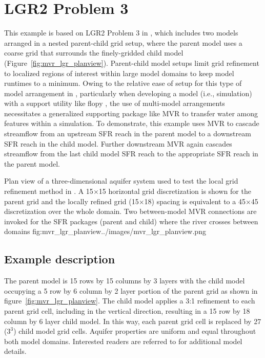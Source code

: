 \section{LGR2 Problem 3}

This example is based on LGR2 Problem 3 in \cite{mehl2013}, which includes two models arranged in a nested parent-child grid setup, where the parent model uses a coarse grid that surrounds the finely-gridded child model (Figure~\ref{fig:mvr_lgr_planview}).  Parent-child model setups limit grid refinement to localized regions of interest within large model domains to keep model runtimes to a minimum.  Owing to the relative ease of setup for this type of model arrangement in \mf, particularly when developing a model (i.e., simulation) with a support utility like flopy \citep{bakker2016}, the use of multi-model arrangements necessitates a generalized supporting package like MVR to transfer water among features within a simulation.  To demonstrate, this example uses MVR to cascade streamflow from an upstream SFR reach in the parent model to a downstream SFR reach in the child model.  Further downstream MVR again cascades streamflow from the last child model SFR reach to the appropriate SFR reach in the parent model.  

\begin{StandardFigure}
	{Plan view of a three-dimensional aquifer system used to test the local grid refinement method in \mf. A 15$\times$15 horizontal grid discretization is shown for the parent grid and the locally refined grid (15$\times$18) spacing is equivalent to a 45$\times$45 discretization over the whole domain.  Two between-model MVR connections are invoked for the SFR packages (parent and child) where the river crosses between domains}
	{fig:mvr_lgr_planview}{../images/mvr_lgr_planview.png}
\end{StandardFigure}

\subsection{Example description}

The parent model is 15 rows by 15 columns by 3 layers with the child model occupying a 5 row by 6 column by 2 layer portion of the parent grid as shown in figure~\ref{fig:mvr_lgr_planview}.  The child model applies a 3:1 refinement to each parent grid cell, including in the vertical direction, resulting in a 15 row by 18 column by 6 layer child model.  In this way, each parent grid cell is replaced by 27 ($3^3$) child model grid cells.  Aquifer properties are uniform and equal throughout both model domains.  Interested readers are referred to \cite{mehl2013} for additional model details.  

